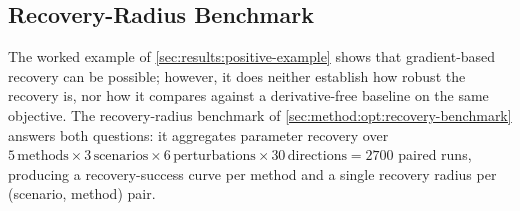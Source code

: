 %
%
%

\subsection{Recovery-Radius Benchmark}\label{sec:results:baseline}
The worked example of \cref{sec:results:positive-example} shows that gradient-based recovery can be possible;
however, it does neither establish how robust the recovery is, nor how it compares against a derivative-free baseline on the same objective.
The recovery-radius benchmark of \cref{sec:method:opt:recovery-benchmark} answers both questions:
it aggregates parameter recovery over $5\,\text{methods}\times 3\,\text{scenarios}\times 6\,\text{perturbations}\times 30\,\text{directions}=2700$ paired runs,
producing a recovery-success curve per method and a single recovery radius per (scenario, method) pair.

